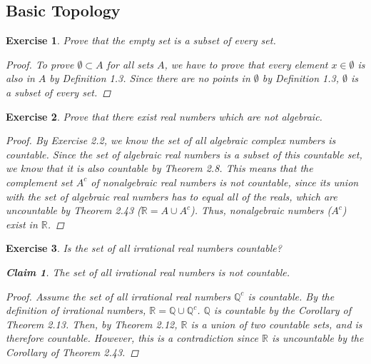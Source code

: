 \documentclass[10pt,letterpaper]{amsart}
\newtheorem{exercise}{Exercise}[section]
\newtheorem*{claim}{Claim}
\theoremstyle{definition}
\theoremstyle{remark}
\numberwithin{equation}{exercise}
\begin{document}
\begin{multicols}{2}
  \section{Basic Topology}
  \begin{exercise}\label{2.1}
    Prove that the empty set is a subset of every set.
    \begin{proof}
      To prove $\emptyset \subset A$ for all sets $A$, we have to prove that every element $x \in \emptyset$ is also in $A$ by Definition 1.3. Since there are no points in $\emptyset$ by Definition 1.3, $\emptyset$ is a subset of every set.
    \end{proof}
  \end{exercise}
  \setcounter{exercise}{2}
  \begin{exercise}\label{2.3}
    Prove that there exist real numbers which are not algebraic.
    \begin{proof}
      By Exercise 2.2, we know the set of all algebraic complex numbers is countable. Since the set of algebraic real numbers is a subset of this countable set, we know that it is also countable by Theorem 2.8. This means that the complement set $A^c$ of nonalgebraic real numbers is not countable, since its union with the set of algebraic real numbers has to equal all of the reals, which are uncountable by Theorem 2.43 ($\mathbb{R} = A \cup A^c$). Thus, nonalgebraic numbers ($A^c$) exist in $\mathbb{R}$.
    \end{proof}
  \end{exercise}
  \begin{exercise}\label{2.4}
    Is the set of all irrational real numbers countable?
    \begin{claim}
      The set of all irrational real numbers is not countable.
    \end{claim}
    \begin{proof}
      Assume the set of all irrational real numbers $\mathbb{Q}^c$ is countable. By the definition of irrational numbers, $\mathbb{R} = \mathbb{Q} \cup \mathbb{Q}^c$. $\mathbb{Q}$ is countable by the Corollary of Theorem 2.13. Then, by Theorem 2.12, $\mathbb{R}$ is a union of two countable sets, and is therefore countable. However, this is a contradiction since $\mathbb{R}$ is uncountable by the Corollary of Theorem 2.43.

\end{proof}
\end{exercise}
\end{multicols}
\end{document}
